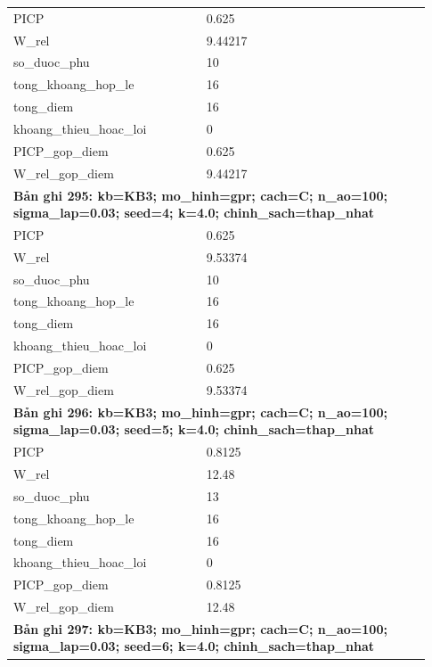 \begin{longtable}{p{0.43\linewidth}p{0.50\linewidth}}
PICP & 0.625 \\
W\_\allowbreak rel & 9.44217 \\
so\_\allowbreak duoc\_\allowbreak phu & 10 \\
tong\_\allowbreak khoang\_\allowbreak hop\_\allowbreak le & 16 \\
tong\_\allowbreak diem & 16 \\
khoang\_\allowbreak thieu\_\allowbreak hoac\_\allowbreak loi & 0 \\
PICP\_\allowbreak gop\_\allowbreak diem & 0.625 \\
W\_\allowbreak rel\_\allowbreak gop\_\allowbreak diem & 9.44217 \\
\midrule
\multicolumn{2}{p{0.95\linewidth}}{\textbf{Bản ghi 295: kb=KB3; mo\_hinh=gpr; cach=C; n\_ao=100; sigma\_lap=0.03; seed=4; k=4.0; chinh\_sach=thap\_nhat}} \\
PICP & 0.625 \\
W\_\allowbreak rel & 9.53374 \\
so\_\allowbreak duoc\_\allowbreak phu & 10 \\
tong\_\allowbreak khoang\_\allowbreak hop\_\allowbreak le & 16 \\
tong\_\allowbreak diem & 16 \\
khoang\_\allowbreak thieu\_\allowbreak hoac\_\allowbreak loi & 0 \\
PICP\_\allowbreak gop\_\allowbreak diem & 0.625 \\
W\_\allowbreak rel\_\allowbreak gop\_\allowbreak diem & 9.53374 \\
\midrule
\multicolumn{2}{p{0.95\linewidth}}{\textbf{Bản ghi 296: kb=KB3; mo\_hinh=gpr; cach=C; n\_ao=100; sigma\_lap=0.03; seed=5; k=4.0; chinh\_sach=thap\_nhat}} \\
PICP & 0.8125 \\
W\_\allowbreak rel & 12.48 \\
so\_\allowbreak duoc\_\allowbreak phu & 13 \\
tong\_\allowbreak khoang\_\allowbreak hop\_\allowbreak le & 16 \\
tong\_\allowbreak diem & 16 \\
khoang\_\allowbreak thieu\_\allowbreak hoac\_\allowbreak loi & 0 \\
PICP\_\allowbreak gop\_\allowbreak diem & 0.8125 \\
W\_\allowbreak rel\_\allowbreak gop\_\allowbreak diem & 12.48 \\
\midrule
\multicolumn{2}{p{0.95\linewidth}}{\textbf{Bản ghi 297: kb=KB3; mo\_hinh=gpr; cach=C; n\_ao=100; sigma\_lap=0.03; seed=6; k=4.0; chinh\_sach=thap\_nhat}} \\

\end{longtable}
